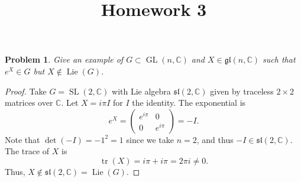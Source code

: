 \documentclass[11pt, letterpaper]{article}
\title{Homework 3}
\theoremstyle{plain}
\newtheorem{problem}{Problem}
\begin{document}
\makeproblem


\begin{problem}
    Give an example of $G \subset \operatorname{GL}(n, \mathbb{C})$ and $X \in \mathfrak{gl}(n, \mathbb{C})$ such that $e^X \in G$ but $X \notin \operatorname{Lie}(G)$.
\end{problem}

\begin{proof}
    Take $G = \operatorname{SL}(2, \mathbb{C})$ with Lie algebra $\mathfrak{sl} (2,\mathbb{C} )$ given by traceless $2\times 2$ matrices over $\mathbb{C} $. Let $X=i\pi I$ for $I$ the identity. The exponential is
    \[
    e^X = \begin{pmatrix} e^{i\pi} & 0 \\ 0 & e^{i\pi} \end{pmatrix}  = -I.
    \]
    Note that $\det (-I)=-1^2=1$ since we take $n=2$, and thus $-I\in \mathfrak{sl} (2,\mathbb{C} )$. The trace of $X$ is
    \[
    \operatorname{tr}(X) = i\pi + i\pi = 2\pi i \neq 0.
    \]
    Thus, $X \notin \mathfrak{sl}(2, \mathbb{C}) = \operatorname{Lie}(G)$.
\end{proof}
\end{document}
